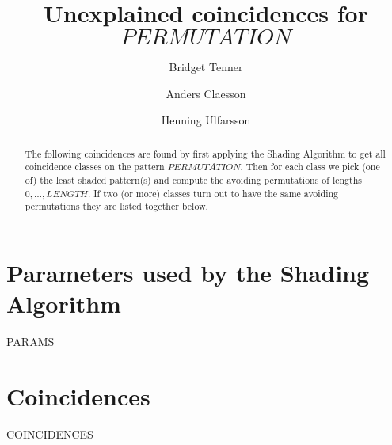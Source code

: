 \documentclass[12pt,reqno]{amsart}
\theoremstyle{plain}
\theoremstyle{definition}
\numberwithin{equation}{section}
\begin{document}
\title{Unexplained coincidences for $PERMUTATION$}

\author[Tenner]{Bridget Tenner}
\author[Claesson]{Anders Claesson}
\author[Ulfarsson]{Henning Ulfarsson}

\address[Tenner]{School of Computer Science, Reykjav\'ik University, Menntavegi 1, 101 Reykjav\'ik, \mbox{Iceland}}
\address[Claesson]{Department of Computer and Information Sciences, University of Strathclyde, Glasgow G1 1XH, UK}
\address[Ulfarsson]{School of Computer Science, Reykjav\'ik University, Menntavegi 1, 101 Reykjav\'ik, Iceland}



\begin{abstract}
The following coincidences are found by first applying the Shading Algorithm to
get all coincidence classes on the pattern $PERMUTATION$. Then for each class we pick (one of) the least shaded pattern(s)
and compute the avoiding permutations of lengths $0, \dots, LENGTH$. If two (or more) classes turn out to have the same avoiding permutations they
are listed together below.
\end{abstract}



\maketitle

\section{Parameters used by the Shading Algorithm}
PARAMS

\section{Coincidences}
COINCIDENCES
\end{document}
